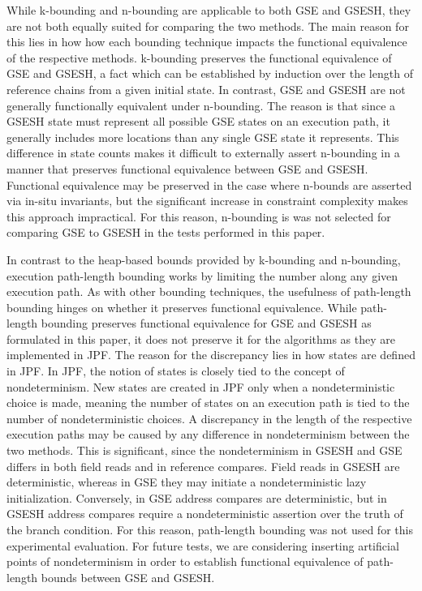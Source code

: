 While k-bounding and n-bounding are applicable to both GSE and GSESH, they are not both equally suited for comparing the two methods. The main reason for this lies in how how each bounding technique impacts the functional equivalence of the respective methods.  k-bounding preserves the functional equivalence of GSE and GSESH, a fact which can be established by induction over the length of reference chains from a given initial state. In contrast, GSE and GSESH are not generally functionally equivalent under n-bounding. The reason is that since a GSESH state must represent all possible GSE states on an execution path, it generally includes more locations than any single GSE state it represents. This difference in state counts makes it difficult to externally assert n-bounding in a manner that preserves functional equivalence between GSE and GSESH. Functional equivalence may be preserved in the case where n-bounds are asserted via in-situ invariants, but the significant increase in constraint complexity makes this approach impractical. For this reason, n-bounding is was not selected for comparing GSE to GSESH in the tests performed in this paper.

In contrast to the heap-based bounds provided by k-bounding and n-bounding, execution path-length bounding works by limiting the number along any given execution path. As with other bounding techniques, the usefulness of path-length bounding hinges on whether it preserves functional equivalence. While path-length bounding preserves functional equivalence for GSE and GSESH as formulated in this paper, it does not preserve it for the algorithms as they are implemented in JPF. The reason for the discrepancy lies in how states are defined in JPF. In JPF, the notion of states is closely tied to the concept of nondeterminism. New states are created in JPF only when a nondeterministic choice is made, meaning the number of states on an execution path is tied to the number of nondeterministic choices. A discrepancy in the length of the respective execution paths may be caused by any difference in nondeterminism between the two methods. This is significant, since the nondeterminism in GSESH and GSE differs in both field reads and in reference compares. Field reads in GSESH are deterministic, whereas in GSE they may initiate a nondeterministic lazy initialization. Conversely, in GSE address compares are deterministic, but in GSESH address compares require a nondeterministic assertion over the truth of the branch condition. For this reason, path-length bounding was not used for this experimental evaluation. For future tests, we are considering inserting artificial points of nondeterminism in order to establish functional equivalence of path-length bounds between GSE and GSESH. 

